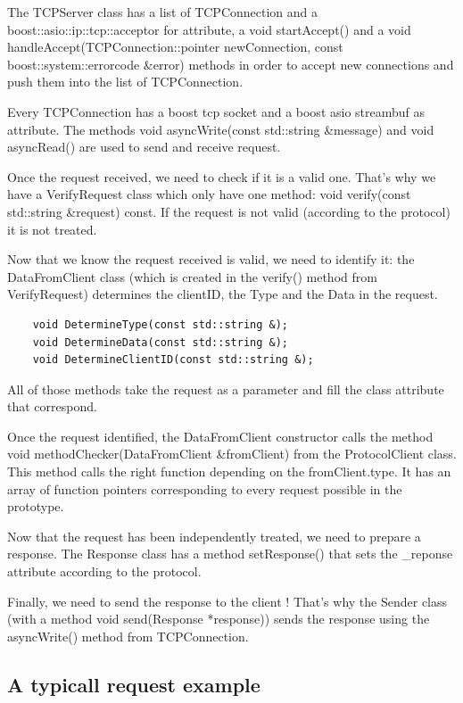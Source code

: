 \documentclass{article}
\begin{document}
  \bigskip
  The TCPServer class has a list of TCPConnection and a boost::asio::ip::tcp::acceptor for attribute, a void startAccept() and a void handleAccept(TCPConnection::pointer newConnection, const boost::system::errorcode &error) methods in order to accept new connections and push them into the list of TCPConnection.

  \bigskip
  Every TCPConnection has a boost tcp socket and a boost asio streambuf as attribute. The methods void asyncWrite(const std::string &message) and void asyncRead() are used to send and receive request.

  \bigskip
  Once the request received, we need to check if it is a valid one. That's why we have a VerifyRequest class which only have one method: void verify(const std::string &request) const. If the request is not valid (according to the protocol) it is not treated.

  \bigskip
  Now that we know the request received is valid, we need to identify it: the DataFromClient class (which is created in the verify() method from VerifyRequest) determines the clientID, the Type and the Data in the request.
  \begin{lstlisting}
    void DetermineType(const std::string &);
    void DetermineData(const std::string &);
    void DetermineClientID(const std::string &);
  \end{lstlisting}

  All of those methods take the request as a parameter and fill the class attribute that correspond.

  \bigskip
  Once the request identified, the DataFromClient constructor calls the method void methodChecker(DataFromClient &fromClient) from the ProtocolClient class.
  This method calls the right function depending on the fromClient.type. It has an array of function pointers corresponding to every request possible in the prototype.

  \bigskip
  Now that the request has been independently treated, we need to prepare a response. The Response class has a method setResponse() that sets the \_reponse attribute according to the protocol.

  \bigskip
  Finally, we need to send the response to the client ! That's why the Sender class (with a method void send(Response *response)) sends the response using the asyncWrite() method from TCPConnection.

  \newpage

  \subsection{A typicall request example}
\end{document}
